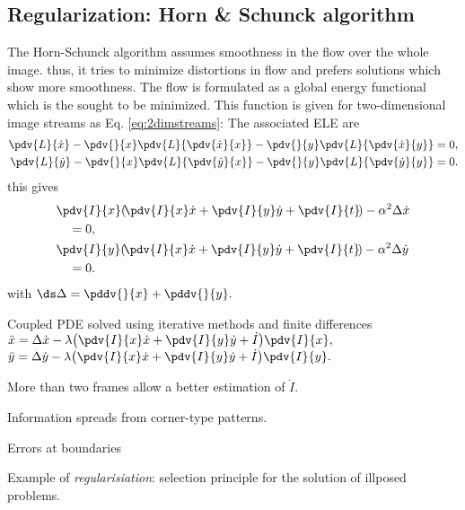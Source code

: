 \begin{compactdesc}
		\section{Regularization: Horn \& Schunck algorithm} 
		The Horn-Schunck algorithm assumes smoothness in the flow over the whole image. thus, it tries to minimize distortions in flow and prefers solutions which show more smoothness. The flow is formulated as a global energy functional which is the sought to be minimized. This function is given for two-dimensional image streams as Eq. \ref{eq:2dimstreams}:
		The associated ELE are 
		\begin{align*}
			\pdv{L}{\dot{x}}-\pdv{}{x}\pdv{L}{\pdv{\dot{x}}{x}}-\pdv{}{y}\pdv{L}{\pdv{\dot{x}}{y}}&=0,\\
			\pdv{L}{\dot{y}}-\pdv{}{x}\pdv{L}{\pdv{\dot{y}}{x}}-\pdv{}{y}\pdv{L}{\pdv{\dot{y}}{y}}&=0.
		\end{align*}
			this gives
		\begin{align*}
			&\pdv{I}{x}\!\left(\! \pdv{I}{x}\dot{x}+\pdv{I}{y}\dot{y}+\pdv{I}{t} \!\right)-\alpha^2\Delta \dot{x}\\
			&\quad=0,\\
			&\pdv{I}{y}\!\left(\! \pdv{I}{x}\dot{x}+\pdv{I}{y}\dot{y}+\pdv{I}{t} \!\right)-\alpha^2\Delta \dot{y}\\
			&\quad=0.
		\end{align*}
		with $\ds\Delta=\pddv{}{x}+\pddv{}{y}.$
	\item[\lp{Remarks}]\hfill
		\begin{enumerate*}[label=\protect\circled{\arabic*}]
			\item Coupled PDE solved using iterative methods and finite differences
				$\ddot{x}=\Delta \dot{x}-\lambda\!\left( \pdv{I}{x}\dot{x}+\pdv{I}{y}\dot{y}+\dot{I} \right)\!\pdv{I}{x},\\$\\
				$\ddot{y}=\Delta \dot{y}-\lambda\!\left( \pdv{I}{x}\dot{x}+\pdv{I}{y}\dot{y}+\dot{I} \right)\!\pdv{I}{y}.$
		\item More than two frames allow a better estimation of $\dot{I}$.
			\item Information spreads from corner-type patterns.
			\item Errors at boundaries
			\item Example of \emph{regularisiation}: selection principle for the solution of illposed problems.
		\end{enumerate*}

\end{compactdesc}
